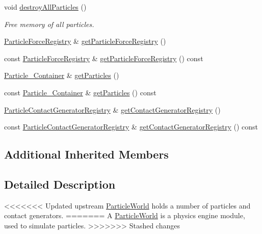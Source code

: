 \begin{DoxyCompactItemize}
void \mbox{\hyperlink{classr3_1_1_particle_world_aa061b4eab09216fb7e3a8d08cbdb6dd2}{destroy\+All\+Particles}} ()
\begin{DoxyCompactList}\small\item\em Free memory of all particles. \end{DoxyCompactList}\item 
\mbox{\hyperlink{classr3_1_1_particle_force_registry}{Particle\+Force\+Registry}} \& \mbox{\hyperlink{classr3_1_1_particle_world_aaa3f952fdfd8862673d41afa078245bf}{get\+Particle\+Force\+Registry}} ()
\item 
const \mbox{\hyperlink{classr3_1_1_particle_force_registry}{Particle\+Force\+Registry}} \& \mbox{\hyperlink{classr3_1_1_particle_world_add0e006264e25065ff226eafc0c1a29d}{get\+Particle\+Force\+Registry}} () const
\item 
\mbox{\hyperlink{classr3_1_1_particle_world_aa354f6786c0837674fe8286f00465631}{Particle\+\_\+\+Container}} \& \mbox{\hyperlink{classr3_1_1_particle_world_a00a5014002f28e35ebb59a3f8175db3c}{get\+Particles}} ()
\item 
const \mbox{\hyperlink{classr3_1_1_particle_world_aa354f6786c0837674fe8286f00465631}{Particle\+\_\+\+Container}} \& \mbox{\hyperlink{classr3_1_1_particle_world_ab816d6bca8b42fdf16170275087008f0}{get\+Particles}} () const
\item 
\mbox{\hyperlink{classr3_1_1_particle_contact_generator_registry}{Particle\+Contact\+Generator\+Registry}} \& \mbox{\hyperlink{classr3_1_1_particle_world_a85fc9fcf5c51a5bbce206a35a82f8ccf}{get\+Contact\+Generator\+Registry}} ()
\item 
const \mbox{\hyperlink{classr3_1_1_particle_contact_generator_registry}{Particle\+Contact\+Generator\+Registry}} \& \mbox{\hyperlink{classr3_1_1_particle_world_ab5cd3adaed73294927de72f3293b0709}{get\+Contact\+Generator\+Registry}} () const
\end{DoxyCompactItemize}
\subsection*{Additional Inherited Members}


\subsection{Detailed Description}
<<<<<<< Updated upstream
\mbox{\hyperlink{classr3_1_1_particle_world}{Particle\+World}} holds a number of particles and contact generators. 
=======
A \mbox{\hyperlink{classr3_1_1_particle_world}{Particle\+World}} is a physics engine module, used to simulate particles. 
>>>>>>> Stashed changes

